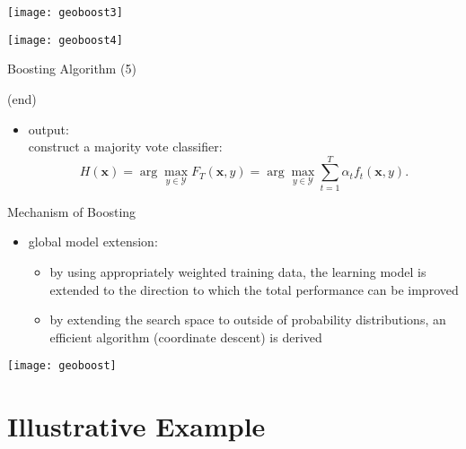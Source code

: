 \documentclass[fleqn,aspectratio=1610]{beamer}
\begin{document}
\begin{frame}[label={sec:org8f58e5e}]{}
\begin{center}
\texttt{[image: geoboost3]}
\end{center}
\end{frame}

\begin{frame}[label={sec:org89c95ea}]{}
\begin{center}
\texttt{[image: geoboost4]}
\end{center}
\end{frame}

\begin{frame}[label={sec:org02b8d86}]{Boosting Algorithm (5)}
\begin{block}{(end)}
\begin{itemize}
\item \alert{output:} \\[0pt]
construct a majority vote classifier:
\begin{equation}
  H(\boldsymbol{x})
  =\arg\max_{y\in\mathcal{Y}}F_{T}(\boldsymbol{x},y)
  =\arg\max_{y\in\mathcal{Y}}\sum_{t=1}^T\alpha_{t}f_{t}(\boldsymbol{x},y).
\end{equation}
\end{itemize}
\end{block}
\end{frame}

\begin{frame}[label={sec:org77bdf0b}]{Mechanism of Boosting}
\begin{itemize}
\item global model extension:
\begin{itemize}
\item by using appropriately weighted training data,
the learning model is extended to the direction to which
the total performance can be improved
\item by extending the search space to outside of probability
distributions,
an efficient algorithm (coordinate descent) is derived
\end{itemize}
\end{itemize}
\begin{center}
\texttt{[image: geoboost]}
\end{center}
\nocite{Murata_etal2004}
\end{frame}

\section{Illustrative Example}
\label{sec:org694af88}
\end{document}
